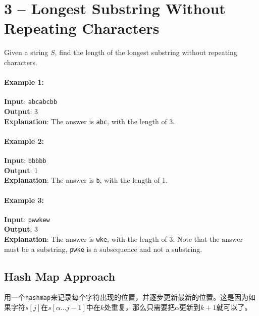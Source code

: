 \section{3 --  Longest Substring Without Repeating Characters}
Given a string $S$, find the length of the longest substring without repeating characters.
\paragraph{Example 1:}
\begin{flushleft}
\textbf{Input}: \texttt{abcabcbb}
\\
\textbf{Output}: 3 
\\
\textbf{Explanation}: The answer is \texttt{abc}, with the length of 3. 
\end{flushleft}
\paragraph{Example 2:}
\begin{flushleft}
\textbf{Input}: \texttt{bbbbb}
\\
\textbf{Output}: 1
\\
\textbf{Explanation}: The answer is \texttt{b}, with the length of 1.
\end{flushleft}
\paragraph{Example 3:}
\begin{flushleft}
\textbf{Input}: \texttt{pwwkew}
\\
\textbf{Output}: 3
\\
\textbf{Explanation}: The answer is \texttt{wke}, with the length of 3. Note that the answer must be a substring, \texttt{pwke} is a subsequence and not a substring.
\end{flushleft}
\subsection{Hash Map Approach}
\begin{CJK*}{UTF8}{gbsn}
用一个\texttt{hashmap}来记录每个字符出现的位置，并逐步更新最新的位置。这是因为如果字符$s[j]$在$s[\alpha\ldots j-1]$中在$k$处重复，那么只需要把$\alpha$更新到$k+1$就可以了。
\end{CJK*}
